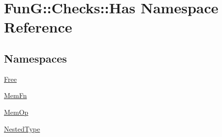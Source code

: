 \hypertarget{namespaceFunG_1_1Checks_1_1Has}{\section{Fun\-G\-:\-:Checks\-:\-:Has Namespace Reference}
\label{namespaceFunG_1_1Checks_1_1Has}
}
\subsection*{Namespaces}
\begin{DoxyCompactItemize}
\item 
\hyperlink{namespaceFunG_1_1Checks_1_1Has_1_1Free}{Free}
\item 
\hyperlink{namespaceFunG_1_1Checks_1_1Has_1_1MemFn}{Mem\-Fn}
\item 
\hyperlink{namespaceFunG_1_1Checks_1_1Has_1_1MemOp}{Mem\-Op}
\item 
\hyperlink{namespaceFunG_1_1Checks_1_1Has_1_1NestedType}{Nested\-Type}
\end{DoxyCompactItemize}
